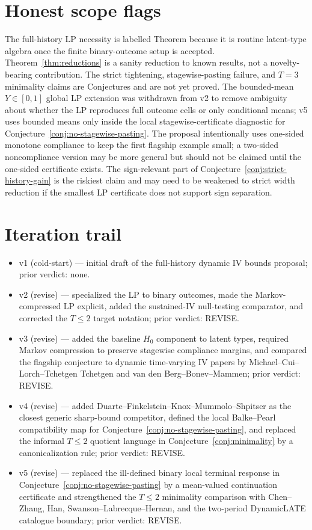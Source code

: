 \documentclass[11pt]{article}
\theoremstyle{definition}
\theoremstyle{plain}
\theoremstyle{remark}
\begin{document}
\section{Honest scope flags}
The full-history LP necessity is labelled Theorem because it is routine latent-type algebra once the finite binary-outcome setup is accepted.  Theorem~\ref{thm:reductions} is a sanity reduction to known results, not a novelty-bearing contribution.  The strict tightening, stagewise-pasting failure, and \(T=3\) minimality claims are Conjectures and are not yet proved.  The bounded-mean \(Y\in[0,1]\) global LP extension was withdrawn from v2 to remove ambiguity about whether the LP reproduces full outcome cells or only conditional means; v5 uses bounded means only inside the local stagewise-certificate diagnostic for Conjecture~\ref{conj:no-stagewise-pasting}.  The proposal intentionally uses one-sided monotone compliance to keep the first flagship example small; a two-sided noncompliance version may be more general but should not be claimed until the one-sided certificate exists.  The sign-relevant part of Conjecture~\ref{conj:strict-history-gain} is the riskiest claim and may need to be weakened to strict width reduction if the smallest LP certificate does not support sign separation.

\section{Iteration trail}
\begin{itemize}[leftmargin=*]
\item v1 (cold-start) --- initial draft of the full-history dynamic IV bounds proposal; prior verdict: none.
\item v2 (revise) --- specialized the LP to binary outcomes, made the Markov-compressed LP explicit, added the sustained-IV null-testing comparator, and corrected the \(T\le2\) target notation; prior verdict: REVISE.
\item v3 (revise) --- added the baseline \(H_0\) component to latent types, required Markov compression to preserve stagewise compliance margins, and compared the flagship conjecture to dynamic time-varying IV papers by Michael--Cui--Lorch--Tchetgen Tchetgen and van den Berg--Bonev--Mammen; prior verdict: REVISE.
\item v4 (revise) --- added Duarte--Finkelstein--Knox--Mummolo--Shpitser as the closest generic sharp-bound competitor, defined the local Balke--Pearl compatibility map for Conjecture~\ref{conj:no-stagewise-pasting}, and replaced the informal \(T\le2\) quotient language in Conjecture~\ref{conj:minimality} by a canonicalization rule; prior verdict: REVISE.
\item v5 (revise) --- replaced the ill-defined binary local terminal response in Conjecture~\ref{conj:no-stagewise-pasting} by a mean-valued continuation certificate and strengthened the \(T\le2\) minimality comparison with Chen--Zhang, Han, Swanson--Labrecque--Hernan, and the two-period DynamicLATE catalogue boundary; prior verdict: REVISE.
\end{itemize}
\end{document}
